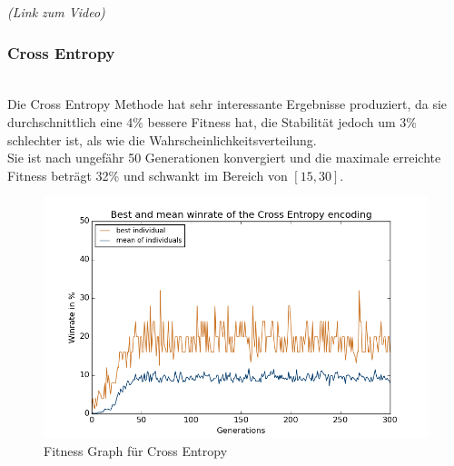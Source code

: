                 \begin{center} \textit{(Link zum Video)} \end{center}

\newpage
            \subsubsection*{Cross Entropy}
                \begin{multicols}{2}
                    \noindent
                    \\[5mm]
                    Die Cross Entropy Methode hat sehr interessante Ergebnisse produziert, da sie durchschnittlich eine 4\% bessere Fitness hat, die Stabilität jedoch um 3\% schlechter ist, als wie die Wahrscheinlichkeitsverteilung.\\[2mm]
                    Sie ist nach ungefähr 50 Generationen konvergiert und die maximale erreichte Fitness beträgt 32\% und schwankt im Bereich von $[15,30]$. 
                    \begin{figure}[H]
                       \includegraphics[scale=0.5]{../pictures/summary/cross-entropy-fitness.png}
                       \caption{Fitness Graph für Cross Entropy}\label{fig:graph-ce}
                    \end{figure}
                \end{multicols}

